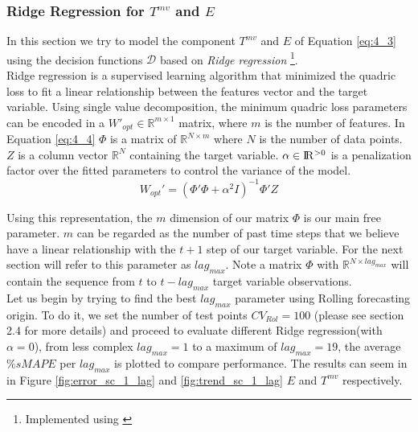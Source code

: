 \subsubsection{Ridge Regression for $T^{mv}$ and $E$}


In this section we try to model the component $T^{mv}$ and $E$ of Equation \ref{eq:4_3} using the decision functions $\mathcal{D}$ based on \emph{Ridge regression} \footnote{Implemented using \cite{scikitlearn22}}.\\

Ridge regression is a supervised learning algorithm that minimized the quadric loss to fit a linear relationship between the features vector and the target variable. Using single value decomposition, the minimum quadric loss parameters can be encoded in a $W'_{opt} \in \mathbb{R}^{m \times 1}$ matrix, where $m$ is the number of features. In Equation \ref{eq:4_4} $\Phi$ is a matrix of $\mathbb{R}^{N \times m}$ where $N$ is the number of data points. $Z$ is a column vector $\mathbb{R}^{N}$ containing the target variable. $\alpha \in {\rm I\!R^{>0}}$ is a penalization factor over the fitted parameters to control the variance of the model.\\


\begin{equation}
W_{opt}'=(\Phi'\Phi+\alpha^2I)^{-1}\Phi'Z
\label{eq:4_4}
\end{equation}

Using this representation, the $m$ dimension of our matrix $\Phi$ is our main free parameter. $m$ can be regarded as the number of past time steps that we believe have a linear relationship with the $t+1$ step of our target variable. For the next section will refer to this parameter as $lag_{max}$. Note a matrix $\Phi$ with $\mathbb{R}^{N \times lag_{max}}$ will contain the sequence from $t$ to $t-lag_{max}$ target variable observations.\\ 

Let us begin by trying to find the best $lag_{max}$ parameter using Rolling forecasting origin. To do it, we set the number of test points $CV_{Rol}=100$ (please see section 2.4 for more details) and proceed to evaluate different Ridge regression(with $\alpha=0$), from less complex $lag_{max}=1$ to  a maximum of $lag_{max}=19$, the average $\%sMAPE$ per $lag_{max}$ is plotted to compare performance. The results can seem in in Figure \ref{fig:error_sc_1_lag} and \ref{fig:trend_sc_1_lag} $E$ and $T^{mv}$ respectively.\\ 


